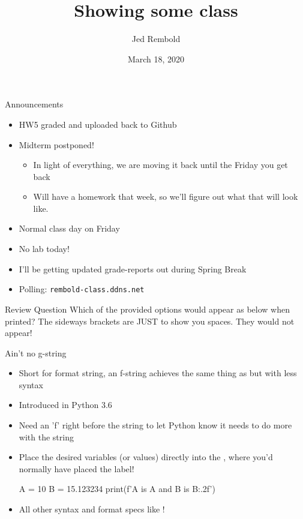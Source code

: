 \documentclass[pdf, aspectratio=169, 12pt]{beamer}
\title{Showing some class}
\author{Jed Rembold}
\date{March 18, 2020}
\begin{document}
\begin{frame}{Announcements}
	\begin{itemize}
		\item HW5 graded and uploaded back to Github
		\item Midterm postponed!
			\begin{itemize}
				\item In light of everything, we are moving it back until the Friday you get back
				\item Will have a homework that week, so we'll figure out what that will look like.
			\end{itemize}
		\item Normal class day on Friday
		\item No lab today!
		\item I'll be getting updated grade-reports out during Spring Break
		\item Polling: \nolinkurl{rembold-class.ddns.net}
	\end{itemize}
\end{frame}

\begin{frame}[fragile]{Review Question}
	Which of the provided options would appear as below when printed? The sideways brackets are JUST to show you spaces. They would not appear!
	\begin{center}
	\end{center}
	\begin{poll}
	\item {}
	\item {}
	\item {}
	\item {}
	\end{poll}
\end{frame}


\begin{frame}[fragile]{Ain't no g-string}
	\vspace{5mm}
	\begin{itemize}
		\item Short for format string, an f-string achieves the same thing as  but with less syntax
		\item Introduced in Python 3.6
		\item Need an 'f' right before the string to let Python know it needs to do more with the string
		\item Place the desired variables (or values) directly into the \pyi{\{ \}}, where you'd normally have placed the label!
			\begin{pythoncode}
				A = 10
				B = 15.123234
				print(f'A is {A} and B is {B:.2f}')
			\end{pythoncode}
		\item All other syntax and format specs like !
	\end{itemize}
\end{frame}
\end{document}

